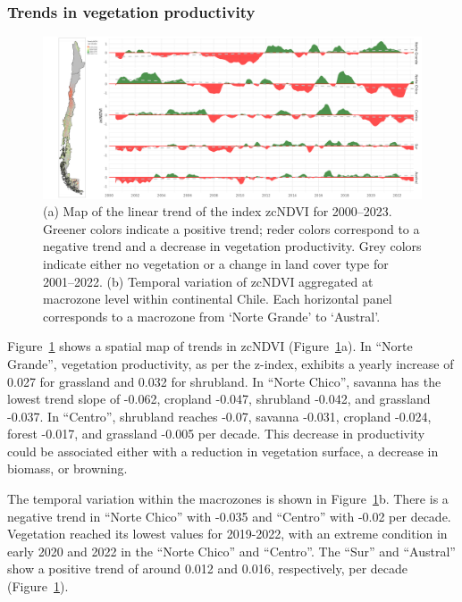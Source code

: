 \documentclass[
  authoryear,
  preprint,
  3p,
  onecolumn]{elsarticle}
\begin{document}
\hypertarget{trends-in-vegetation-productivity}{%
\subsubsection{Trends in vegetation
productivity}\label{trends-in-vegetation-productivity}}

\begin{figure}[!ht]

{\centering \includegraphics{../output/figs/temporal_variation_zcNDVI6_macrozonas_con_mapa.png}

}

\caption{\label{fig-zcNDVI_var}(a) Map of the linear trend of the index
zcNDVI for 2000--2023. Greener colors indicate a positive trend; reder
colors correspond to a negative trend and a decrease in vegetation
productivity. Grey colors indicate either no vegetation or a change in
land cover type for 2001--2022. (b) Temporal variation of zcNDVI
aggregated at macrozone level within continental Chile. Each horizontal
panel corresponds to a macrozone from `Norte Grande' to `Austral'.}

\end{figure}

Figure~\ref{fig-zcNDVI_var} shows a spatial map of trends in zcNDVI
(Figure~\ref{fig-zcNDVI_var}a). In ``Norte Grande'', vegetation
productivity, as per the z-index, exhibits a yearly increase of 0.027
for grassland and 0.032 for shrubland. In ``Norte Chico'', savanna has
the lowest trend slope of -0.062, cropland -0.047, shrubland -0.042, and
grassland -0.037. In ``Centro'', shrubland reaches -0.07, savanna
-0.031, cropland -0.024, forest -0.017, and grassland -0.005 per decade.
This decrease in productivity could be associated either with a
reduction in vegetation surface, a decrease in biomass, or browning.

The temporal variation within the macrozones is shown in
Figure~\ref{fig-zcNDVI_var}b. There is a negative trend in ``Norte
Chico'' with -0.035 and ``Centro'' with -0.02 per decade. Vegetation
reached its lowest values for 2019-2022, with an extreme condition in
early 2020 and 2022 in the ``Norte Chico'' and ``Centro''. The ``Sur''
and ``Austral'' show a positive trend of around 0.012 and 0.016,
respectively, per decade (Figure~\ref{fig-zcNDVI_var}).
\end{document}
